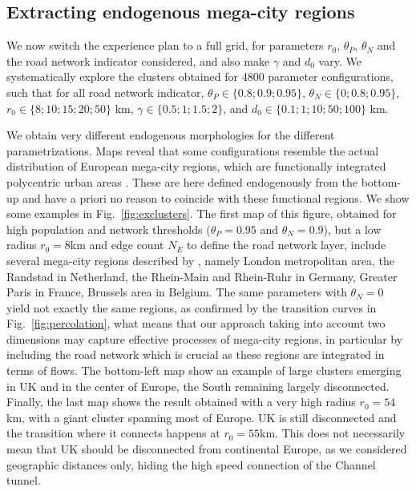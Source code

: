 \documentclass{jimis-en}
\begin{document}
\subsection{Extracting endogenous mega-city regions}


We now switch the experience plan to a full grid, for parameters $r_0$, $\theta_P$, $\theta_N$ and the road network indicator considered, and also make $\gamma$ and $d_0$ vary. We systematically explore the clusters obtained for 4800 parameter configurations, such that for all road network indicator, $\theta_P \in \{ 0.8 ; 0.9 ; 0.95 \}$, $\theta_N \in \{0 ; 0.8 ; 0.95 \}$, $r_0 \in \{ 8 ; 10 ; 15 ; 20 ; 50\}$ km, $\gamma \in \{ 0.5 ; 1 ; 1.5 ; 2\}$, and $d_0 \in \{ 0.1 ; 1 ; 10 ; 50 ; 100\}$ km.


We obtain very different endogenous morphologies for the different parametrizations. Maps reveal that some configurations resemble the actual distribution of European mega-city regions, which are functionally integrated polycentric urban areas \citep{hall2006polycentric}. These are here defined endogenously from the bottom-up and have a priori no reason to coincide with these functional regions. We show some examples in Fig.~\ref{fig:exclusters}. The first map of this figure, obtained for high population and network thresholds ($\theta_P = 0.95$ and $\theta_N = 0.9$), but a low radius $r_0 = 8$km and edge count $N_E$ to define the road network layer, include several mega-city regions described by \citep{hall2006polycentric}, namely London metropolitan area, the Randstad in Netherland, the Rhein-Main and Rhein-Ruhr in Germany, Greater Paris in France, Brussels area in Belgium. The same parameters with $\theta_N = 0$ yield not exactly the same regions, as confirmed by the transition curves in Fig.~\ref{fig:percolation}, what means that our approach taking into account two dimensions may capture effective processes of mega-city regions, in particular by including the road network which is crucial as these regions are integrated in terms of flows. The bottom-left map show an example of large clusters emerging in UK and in the center of Europe, the South remaining largely disconnected. Finally, the last map shows the result obtained with a very high radius $r_0 = 54$km, with a giant cluster spanning most of Europe. UK is still disconnected and the transition where it connects happens at $r_0 = 55$km. This does not necessarily mean that UK should be disconnected from continental Europe, as we considered geographic distances only, hiding the high speed connection of the Channel tunnel.
\end{document}
